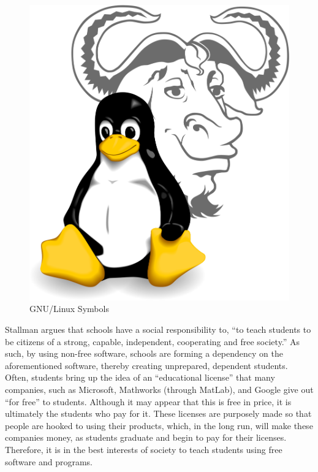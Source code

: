 \documentclass[12pt]{article}
\begin{document}
\begin{multicols}{3}
  \begin{figure}
  \includegraphics[width=\linewidth]{Images/gnulinux.png}
  \caption{\tiny GNU/Linux Symbols}
  \end{figure}

  \vfill

  Stallman argues that schools have a social responsibility to, “to teach students to be citizens of a strong, capable, independent, cooperating and free society.” As such, by using non-free software, schools are forming a dependency on the aforementioned software, thereby creating unprepared, dependent students. Often, students bring up the idea of an “educational license” that many companies, such as Microsoft, Mathworks (through MatLab), and Google give out “for free” to students. Although it may appear that this is free in price, it is ultimately the students who pay for it. These licenses are purposely made so that people are hooked to using their products, which, in the long run, will make these companies money, as students graduate and begin to pay for their licenses. Therefore, it is in the best interests of society to teach students using free software and programs. 

 \end{multicols}
\end{document}
